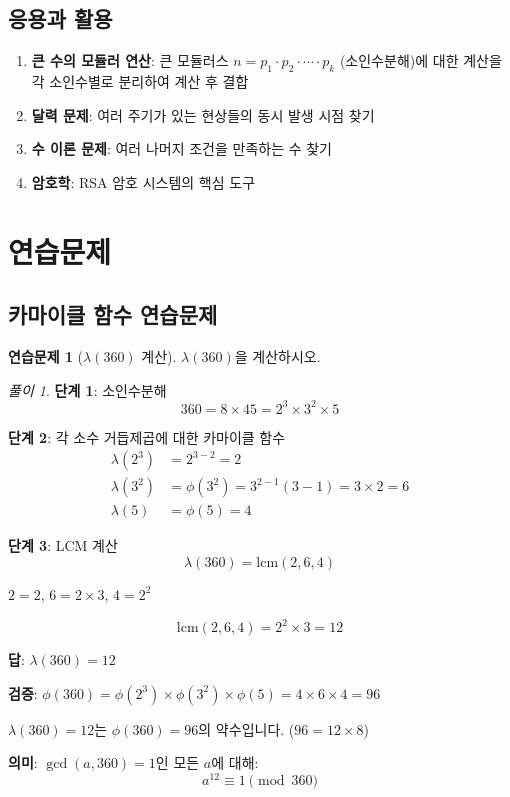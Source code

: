 \documentclass[11pt,a4paper]{article}
\theoremstyle{definition}
\newtheorem{exercise}{연습문제}[section]
\theoremstyle{remark}
\newtheorem*{solution}{풀이}
\begin{document}
\subsection{응용과 활용}

\begin{enumerate}
    \item \textbf{큰 수의 모듈러 연산}: 큰 모듈러스 $n = p_1 \cdot p_2 \cdot \cdots \cdot p_k$ (소인수분해)에 대한 계산을 각 소인수별로 분리하여 계산 후 결합
    \item \textbf{달력 문제}: 여러 주기가 있는 현상들의 동시 발생 시점 찾기
    \item \textbf{수 이론 문제}: 여러 나머지 조건을 만족하는 수 찾기
    \item \textbf{암호학}: RSA 암호 시스템의 핵심 도구
\end{enumerate}

\newpage

\section{연습문제}

\subsection{카마이클 함수 연습문제}

\begin{exercise}[$\lambda(360)$ 계산]
$\lambda(360)$을 계산하시오.
\end{exercise}

\begin{solution}

\textbf{단계 1}: 소인수분해
\[360 = 8 \times 45 = 2^3 \times 3^2 \times 5\]

\textbf{단계 2}: 각 소수 거듭제곱에 대한 카마이클 함수
\begin{align*}
\lambda(2^3) &= 2^{3-2} = 2 \\
\lambda(3^2) &= \phi(3^2) = 3^{2-1}(3-1) = 3 \times 2 = 6 \\
\lambda(5) &= \phi(5) = 4
\end{align*}

\textbf{단계 3}: LCM 계산
\[\lambda(360) = \text{lcm}(2, 6, 4)\]

$2 = 2$, $6 = 2 \times 3$, $4 = 2^2$

\[\text{lcm}(2, 6, 4) = 2^2 \times 3 = 12\]

\textbf{답}: $\lambda(360) = 12$

\textbf{검증}: $\phi(360) = \phi(2^3) \times \phi(3^2) \times \phi(5) = 4 \times 6 \times 4 = 96$

$\lambda(360) = 12$는 $\phi(360) = 96$의 약수입니다. ($96 = 12 \times 8$) \checkmark

\textbf{의미}: $\gcd(a, 360) = 1$인 모든 $a$에 대해:
\[a^{12} \equiv 1 \pmod{360}\]
\end{solution}
\end{document}
